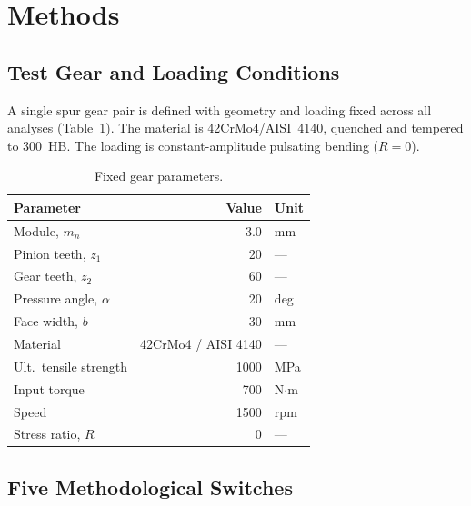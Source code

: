 \documentclass[twocolumn,12pt,a4paper]{article}
\begin{document}
\section{Methods}
\label{sec:methods}

\subsection{Test Gear and Loading Conditions}

A single spur gear pair is defined with geometry and loading fixed
across all analyses (Table~\ref{tab:gear}). The material is
42CrMo4/AISI~4140, quenched and tempered to 300~HB. The loading is
constant-amplitude pulsating bending ($R=0$).

\begin{table}[h]
\centering
\caption{Fixed gear parameters.}
\label{tab:gear}
\footnotesize
\begin{tabular}{p{2.9cm} r l}
\toprule
Parameter & Value & Unit \\
\midrule
Module, $m_n$ & 3.0 & mm \\
Pinion teeth, $z_1$ & 20 & --- \\
Gear teeth, $z_2$ & 60 & --- \\
Pressure angle, $\alpha$ & 20 & deg \\
Face width, $b$ & 30 & mm \\
Material & 42CrMo4 / AISI 4140 & --- \\
Ult.\ tensile strength & 1000 & MPa \\
Input torque & 700 & N$\cdot$m \\
Speed & 1500 & rpm \\
Stress ratio, $R$ & 0 & --- \\
\bottomrule
\end{tabular}
\end{table}

\subsection{Five Methodological Switches}
\end{document}
